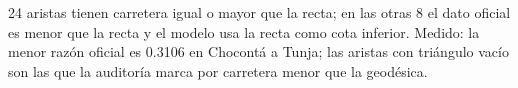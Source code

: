 {24 aristas tienen carretera igual o mayor que la recta; en las otras 8 el dato oficial es menor que la recta y el modelo usa la recta como cota inferior.}
{Medido: la menor razón oficial es 0.3106 en Chocontá a Tunja; las aristas con triángulo vacío son las que la auditoría marca por carretera menor que la geodésica.}
